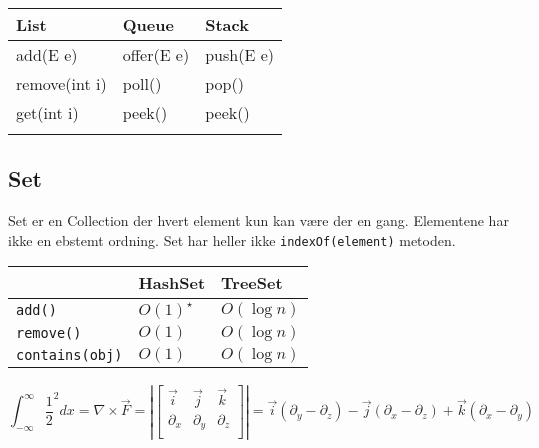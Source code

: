 \documentclass[twocolumn]{article}
\begin{document}
\begin{table}[H]
    \begin{tabular}[c]{|l|l|l|}
        \hline
         List&Queue&Stack  \\
        \hline
         add(E e)&offer(E e)&push(E e)  \\
         remove(int i)&poll()&pop()  \\
         get(int i)&peek()&peek()  \\
         &&  \\
        \hline
    \end{tabular}
\end{table}

\subsection{Set}

Set er en Collection der hvert element kun kan være der en gang. Elementene har ikke en ebstemt ordning. Set har heller ikke \verb!indexOf(element)! metoden.

\begin{table}[H]
        \begin{tabular}[c]{|l|l|l|}
            \hline
            &HashSet&TreeSet \\
            \hline
             \verb!add()!&\(O(1) ^{\star} \) & \( O(\log n) \)   \\
             \verb!remove()!& \( O(1) \)& \( O\left( \log n \right) \)  \\
                   \verb!contains(obj)!&\( O\left( 1 \right) \)&\( O\left( \log n \right) \)\\
            \hline
        \end{tabular}
\end{table}


\[ \int_{-\infty}^{\infty} \frac{1}{2} ^2 dx = \nabla \times \vec{F} =
\left|\begin{bmatrix}
\vec{i} & \vec{j} & \vec{k} \\
\partial_x & \partial_y & \partial_z \\
 &  & 
\end{bmatrix}\right| = \vec{i}\left(\partial_y  - \partial_z  \right) -\vec{j}\left(\partial_x  - \partial_z  \right) + \vec{k}\left(\partial_x -  \partial_y  \right) \]


\begin{figure}[H]
	\centering
\end{figure}
\end{document}
